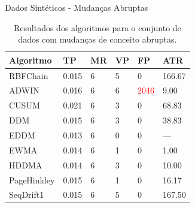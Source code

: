 \documentclass[10pt]{beamer}
\begin{document}
\begin{frame}{Dados Sintéticos -  Mudanças Abruptas}
    \begin{table}[ht]
        \centering
        \caption{Resultados dos algoritmos para o conjunto de dados com mudanças de conceito abruptas.}
        \label{tbl:exp2}
        \begin{tabular}{llllll}

    \toprule
    Algoritmo              & TP                     & MR                     & VP                     & FP                     & ATR                    \\
    \midrule
    RBFChain               & 0.015                  & 6                      & \alert{5}              & 0                      & 166.67                 \\
    ADWIN                  & 0.016                  & 6                      & 6                      & \textcolor{red}{2046}  & 9.00                   \\
    CUSUM                  & 0.021                  & 6                      & 3                      & 0                      & 68.83                  \\
    DDM                    & 0.015                  & 6                      & 3                      & 0                      & 38.83                  \\
    EDDM                   & 0.013                  & 6                      & 0                      & 0                      & ---                    \\
    EWMA                   & 0.014                  & 6                      & 1                      & 0                      & 1.00                   \\
    HDDMA                  & 0.014                  & 6                      & 3                      & 0                      & 10.00                    \\
    PageHinkley            & 0.015                  & 6                      & 1                      & 0                      & 16.17                  \\
    SeqDrift1              & 0.015                  & 6                      & \alert{5}              & 0                      & 167.50                 \\
    \bottomrule

        \end{tabular}
        \end{table}
\end{frame}
\end{document}
